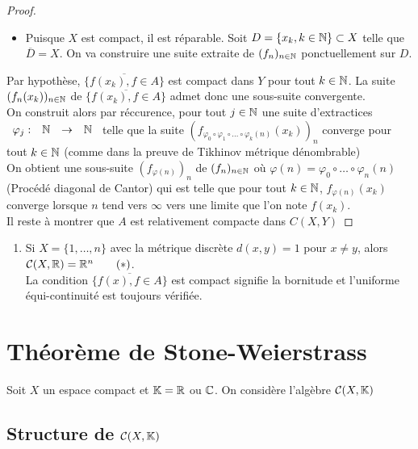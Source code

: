 \documentclass[]{report}
\begin{document}
\begin{proof}
\begin{itemize}
            \item Puisque $X$ est compact, il est réparable. Soit $D=\{x_k,k\in \mathbb{N}\}\subset X$ telle que $\overline{D}=X$. On va construire une suite extraite de $(f_n)_{n\in\mathbb{N}}$ ponctuellement sur $D$.
        \end{itemize}
        Par hypothèse, $\overline{\{f(x_k),f\in A\}}$ est compact dans $Y$ pour tout $k\in \mathbb{N}$. La suite $(f_n(x_k))_{n\in\mathbb{N}}$ de $\overline{\{f(x_k),f\in A\}}$ admet donc une sous-suite convergente.\\
        On construit alors par réccurence, pour tout $j\in \mathbb{N}$ une suite d'extractices $\begin{array}{ccccc} \varphi_j : & \mathbb{N} & \to & \mathbb{N} \end{array}$ telle que la suite $(f_{\varphi_0\circ\varphi_1\circ\ldots\circ\varphi_k(n)}(x_k))_n$ converge pour tout $k\in \mathbb{N}$ (comme dans la preuve de Tikhinov métrique dénombrable)\\
        On obtient une sous-suite $(f_{\varphi(n)})_n$ de $(f_n)_{n\in\mathbb{N}}$ où $\varphi(n)=\varphi_0\circ \ldots\circ \varphi_n(n)$ (Procédé diagonal de Cantor) qui est telle que pour tout $k\in \mathbb{N}$, $f_{\varphi(n)}(x_k)$ converge lorsque $n$ tend vers $\infty$ vers une limite que l'on note $f(x_k)$.\\
        Il reste à montrer que $A$ est relativement compacte dans $C(X,Y)$
    \end{proof}

    \begin{re}{}{}
        \begin{enumerate}
            \item Si $X=\{1,\ldots,n\}$ avec la métrique discrète $d(x,y)=1$ pour $x\neq y$, alors $\mathcal{C}(X,\mathbb{R})=\mathbb{R}^n\qquad (*)$.\\
            La condition $\overline{\{f(x),f\in A\}}$ est compact signifie la bornitude et l'uniforme équi-continuité est toujours vérifiée.
        \end{enumerate}
    \end{re}

    \section{Théorème de Stone-Weierstrass}

    Soit $X$ un espace compact et $\mathbb{K}=\mathbb{R}$ ou $\mathbb{C}$. On considère l'algèbre $\mathcal{C}(X,\mathbb{K})$

    \subsection*{Structure de $\mathcal{C}(X,\mathbb{K})$}
\end{document}
